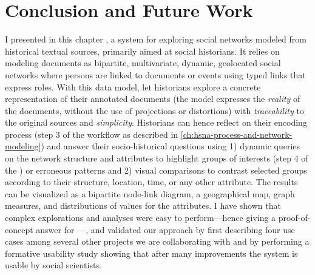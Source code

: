 \section{Conclusion and Future Work}

I presented in this chapter \name, a \va system for exploring social networks modeled from historical textual sources, primarily aimed at social historians.
It relies on modeling documents as bipartite, multivariate, dynamic, geolocated social networks where persons are linked to documents or events using typed links that express roles.
With this data model, \name let historians explore a concrete representation of their annotated documents (\ie the model expresses the \emph{reality} of the documents, without the use of projections or distortions) with \emph{traceability} to the original sources and \emph{simplicity}.
Historians can hence reflect on their encoding process (step 3 of the \hsna workflow as described in \autoref{ch:hsna-process-and-network-modeling}) and answer their socio-historical questions using 1) dynamic queries on the network structure and attributes to highlight groups of interests (step 4 of the \hsna) or erroneous patterns and 2) visual comparisons to contrast selected groups according to their structure, location, time, or any other attribute.
The results can be visualized as a bipartite node-link diagram, a geographical map, graph measures, and distributions of values for the attributes.
I have shown that complex explorations and analyses were easy to perform---hence giving a proof-of-concept answer for \qtwo---, and validated our approach by first describing four use cases among several other projects we are collaborating with and by performing a formative usability study showing that after many improvements the system is usable by social scientists.

